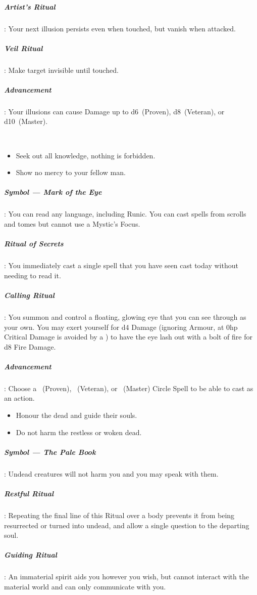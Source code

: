 \documentclass[itdr]{subfiles}
\begin{document}
\subparagraph{Artist's Ritual}: Your next illusion persists even when touched, but vanish when attacked.

\subparagraph{Veil Ritual}: Make target invisible until touched.

\subparagraph{Advancement}: Your illusions can cause Damage up to d6~(Proven), d8~(Veteran), or d10~(Master).

~

{\em\begin{itemize}
		\item Seek out all knowledge, nothing is forbidden.
		\item Show no mercy to your fellow man.
\end{itemize}}

\subparagraph{Symbol --- Mark of the Eye}: You can read any language, including Runic. You can cast spells from scrolls and tomes but cannot use a Mystic's Focus.

\subparagraph{Ritual of Secrets}: You immediately cast a single spell that you have seen cast today without needing to read it.

\subparagraph{Calling Ritual}: You summon and control a floating, glowing eye that you can see through as your own. You may exert yourself for d4 Damage (ignoring Armour, at 0hp Critical Damage is avoided by a ) to have the eye lash out with a bolt of fire for d8 Fire Damage.

\subparagraph{Advancement}: Choose a ~(Proven), ~(Veteran), or ~(Master) Circle Spell to be able to cast as an action.

\vfill
\break

{\em\begin{itemize}
		\item Honour the dead and guide their souls.
		\item Do not harm the restless or woken dead.
\end{itemize}}

\subparagraph{Symbol --- The Pale Book}: Undead creatures will not harm you and you may speak with them.

\subparagraph{Restful Ritual}: Repeating the final line of this Ritual over a body prevents it from being resurrected or turned into undead, and allow a single question to the departing soul.

\subparagraph{Guiding Ritual}: An immaterial spirit aids you however you wish, but cannot interact with the material world and can only communicate with you.
\end{document}
